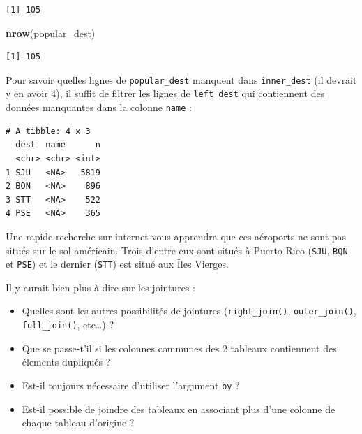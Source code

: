 \documentclass[
  a4paper,
]{article}
\newenvironment{Shaded}{\begin{snugshade}}{\end{snugshade}}
\newcommand{\KeywordTok}[1]{\textcolor[rgb]{0.12,0.11,0.11}{\textbf{#1}}}
\newcommand{\NormalTok}[1]{\textcolor[rgb]{0.12,0.11,0.11}{#1}}
\newcommand{\OperatorTok}[1]{\textcolor[rgb]{0.12,0.11,0.11}{#1}}
\newcommand{\StringTok}[1]{\textcolor[rgb]{0.75,0.01,0.01}{#1}}
\providecommand{\tightlist}{%
  \setlength{\itemsep}{0pt}\setlength{\parskip}{0pt}}
\begin{document}
\begin{verbatim}
[1] 105
\end{verbatim}

\begin{Shaded}
\begin{Highlighting}[]
\KeywordTok{nrow}\NormalTok{(popular_dest)}
\end{Highlighting}
\end{Shaded}

\begin{verbatim}
[1] 105
\end{verbatim}

Pour savoir quelles lignes de \texttt{popular\_dest} manquent dans \texttt{inner\_dest} (il devrait y en avoir 4), il suffit de filtrer les lignes de \texttt{left\_dest} qui contiennent des données manquantes dans la colonne \texttt{name} :

\begin{Shaded}
\end{Shaded}

\begin{verbatim}
# A tibble: 4 x 3
  dest  name      n
  <chr> <chr> <int>
1 SJU   <NA>   5819
2 BQN   <NA>    896
3 STT   <NA>    522
4 PSE   <NA>    365
\end{verbatim}

Une rapide recherche sur internet vous apprendra que ces aéroports ne sont pas situés sur le sol américain. Trois d'entre eux sont situés à Puerto Rico (\texttt{SJU}, \texttt{BQN} et \texttt{PSE}) et le dernier (\texttt{STT}) est situé aux Îles Vierges.

Il y aurait bien plus à dire sur les jointures :

\begin{itemize}
\tightlist
\item
  Quelles sont les autres possibilités de jointures (\texttt{right\_join()}, \texttt{outer\_join()}, \texttt{full\_join()}, etc\ldots) ?
\item
  Que se passe-t'il si les colonnes communes des 2 tableaux contiennent des élements dupliqués ?
\item
  Est-il toujours nécessaire d'utiliser l'argument \texttt{by} ?
\item
  Est-il possible de joindre des tableaux en associant plus d'une colonne de chaque tableau d'origine ?
\end{itemize}
\end{document}
